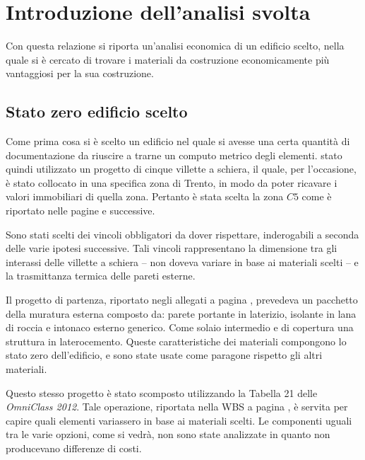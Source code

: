 \chapter{Introduzione dell'analisi svolta}
Con questa relazione si riporta un'analisi economica di un edificio scelto, nella quale si è cercato di trovare i materiali da costruzione economicamente più vantaggiosi per la sua costruzione.
\section{Stato zero edificio scelto}
Come prima cosa si è scelto un edificio nel quale si avesse una certa quantità di documentazione da riuscire a trarne un computo metrico degli elementi.
\e stato quindi utilizzato un progetto di cinque villette a schiera, il quale, per l'occasione, è stato collocato in una specifica zona di Trento, in modo da poter ricavare i valori immobiliari di quella zona. 
Pertanto è stata scelta la zona $C5$ come è riportato nelle pagine \pageref{Edificio} e successive.

Sono stati scelti dei vincoli obbligatori da dover rispettare, inderogabili a seconda delle varie ipotesi successive. 
Tali vincoli rappresentano la dimensione tra gli interassi delle villette a schiera -- non doveva variare in base ai materiali scelti -- e la trasmittanza termica delle pareti esterne. 

Il progetto di partenza, riportato negli allegati a pagina \pageref{piante}, prevedeva un pacchetto della muratura esterna composto da: parete portante in laterizio, isolante in lana di roccia e intonaco esterno generico. Come solaio intermedio e di copertura una struttura in laterocemento.
Queste caratteristiche dei materiali compongono lo stato zero dell'edificio, e sono state usate come paragone rispetto gli altri materiali.

Questo stesso progetto è stato scomposto utilizzando la Tabella 21 delle \emph{OmniClass 2012}. 
Tale operazione, riportata nella WBS a pagina \pageref{WBS}, è servita per capire quali elementi variassero in base ai materiali scelti.
Le componenti uguali tra le varie opzioni, come si vedrà, non sono state analizzate in quanto non producevano differenze di costi.
